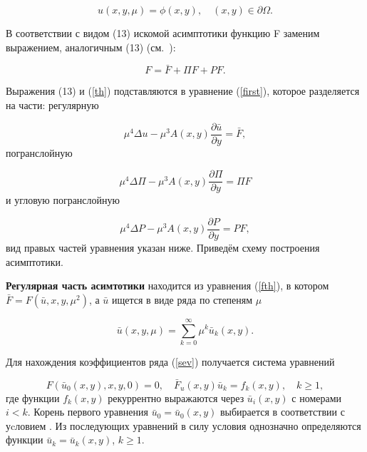 \documentclass[12pt]{article}
\newcommand{\RNumb}[1]{\uppercase\expandafter{\romannumeral #1\relax}}
\begin{document}
\begin{equation} \label{second}  u(x, y, \mu) = \phi(x, y), \quad (x,y) \in \partial \Omega.     \end{equation}

В соответствии с видом (13) искомой асимптотики функцию F заменим выражением, аналогичным (13) (см.~\cite{vasilieva}):

\begin{equation} F = \bar F + \Pi F + PF.   \label{th}   \end{equation}

Выражения (13) и (\ref{th}) подставляются в уравнение (\ref{first}), которое разделяется на части: регулярную

\begin{equation}\label{fth}  \mu^{4}\Delta u - \mu^{3}A(x,y) \frac {\partial \bar u}{\partial y} = \bar F,  \end{equation}
погранслойную

\begin{equation} \label{fif}  \mu^{4}\Delta \Pi  - \mu^{3}A(x,y) \frac {\partial \Pi}{\partial y} = \Pi F    \end{equation}
и угловую погранслойную

\begin{equation} \label{six} \mu^{4}\Delta P  - \mu^{3}A(x,y) \frac {\partial P}{\partial y} = P F  ,   \end{equation}
вид правых частей уравнения указан ниже. Приведём схему построения асимптотики.

{\bf Регулярная часть асимтотики} находится из уравнения (\ref{fth}), в котором $\bar F= F(\bar u, x, y, \mu^{2} )$, а $\bar u$ ищется в виде ряда по степеням $\mu$

\begin{equation}\label{sev} \bar u(x, y, \mu) = \sum_{k = 0}^{\infty} \mu^{k} \bar u_{k}(x, y).      \end{equation}

Для нахождения коэффициентов ряда (\ref{sev}) получается система уравнений

$$ F(\bar u_{0}(x, y), x, y, 0) = 0, \quad \bar F_{u}(x, y)\bar u_{k} = f_{k}(x, y), \quad k \ge 1,  $$
где функции $ f_{k}(x, y)$ рекуррентно выражаются через $\bar u_{i}(x,y)$ с номерами $i < k$.
Корень первого уравнения $\bar u_{0} = \bar u_{0}(x, y)$ выбирается в соответствии с уcловием \RNumb{2}.
Из последующих уравнений в силу условия \RNumb{3} однозначно определяются функции $\bar u_{k} = \bar u_{k}(x, y)$, $k \ge 1$.
\end{document}

